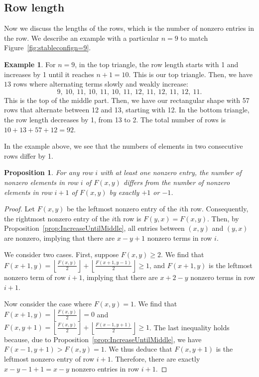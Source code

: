 \documentclass[11pt]{article}
\newtheorem{proposition}[theorem]{Proposition}
\theoremstyle{definition}
\newtheorem{example}{Example}
\theoremstyle{remark}
\newcommand{\floor}[1]{\left\lfloor #1 \right\rfloor}
\begin{document}
\subsection{Row length}

Now we discuss the lengths of the rows, which is the number of nonzero entries in the row. We describe an example with a particular $n = 9$ to match Figure~\ref{fig:stableconfign=9}. 

\begin{example}
For $n=9$, in the top triangle, the row length starts with 1 and increases by 1 until it reaches $n+1 = 10$. This is our top triangle. Then, we have $13$ rows where alternating terms slowly and weakly increase:
\[9,\ 10,\ 11,\ 10,\ 11,\ 10,\ 11,\ 12,\ 11,\ 12,\ 11,\ 12,\ 11.\]
This is the top of the middle part. Then, we have our rectangular shape with 57 rows that alternate between 12 and 13, starting with 12. In the bottom triangle, the row length decreases by 1, from 13 to 2.
The total number of rows is $10+13+57+12 = 92$.\end{example}

In the example above, we see that the numbers of elements in two consecutive rows differ by 1.

\begin{proposition}
For any row $i$ with at least one nonzero entry, the number of nonzero elements in row $i$ of $F(x, y)$ differs from the number of nonzero elements in row $i+1$ of $F(x, y)$ by exactly $+1$ or $-1$.
\end{proposition}
\begin{proof}
Let $F(x, y)$ be the leftmost nonzero entry of the $i$th row. Consequently, the rightmost nonzero entry of the $i$th row is $F(y, x) = F(x,y)$. Then, by Proposition~\ref{prop:IncreaseUntilMiddle}, all entries between $(x, y)$ and $(y, x)$ are nonzero, implying that there are $x-y+1$ nonzero terms in row $i$.

We consider two cases. First, suppose $F(x, y) \ge 2$.  We find that $F(x+1, y) = \floor{\frac{F(x, y)}{2}} + \floor{\frac{F(x+1, y-1)}{2}} \geq 1$, and $F(x+1, y)$ is the leftmost nonzero term of row $i+1$, implying that there are $x+2-y$ nonzero terms in row $i+1$. 

Now consider the case where $F(x, y) = 1$. We find that $F(x+1, y) = \floor{\frac{F(x, y)}{2}} =0$ and $F(x,y+1) = \floor{\frac{F(x, y)}{2}} + \floor{\frac{F(x-1, y+1)}{2}} \geq 1$. The last inequality holds because, due to Proposition~\ref{prop:IncreaseUntilMiddle}, we have $F(x-1, y+1) > F(x, y) = 1$. We thus deduce that $F(x, y+1)$ is the leftmost nonzero entry of row $i+1$. Therefore, there are exactly $x-y-1+1= x-y$ nonzero entries in row $i+1$.
\end{proof}
\end{document}
